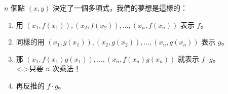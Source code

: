 \documentclass[standalone]{beamer}
\begin{document}
\begin{frame}{}
  $n$ 個點 $(x, y)$ 決定了一個多項式，我們的夢想是這樣的：
  \pause

  \begin{enumerate}[<+->]
    \item \alert<6>{用 $(x_1, f(x_1)), (x_2, f(x_2)), \dots, (x_n, f(x_n))$ 表示 $f$。}
    \item 同樣的用 $(x_1, g(x_1)), (x_2, g(x_2)), \dots, (x_n, g(x_n))$ 表示 $g$。
    \item 那 $(x_1, f(x_1)g(x_1)), \dots, (x_n, f(x_n)g(x_n))$ 就表示 $f \cdot g$。\\
      \alert<.>{只要 $n$ 次乘法！}
    \item 再反推的 $f \cdot g$。
  \end{enumerate}
  
\end{frame}
\end{document}

